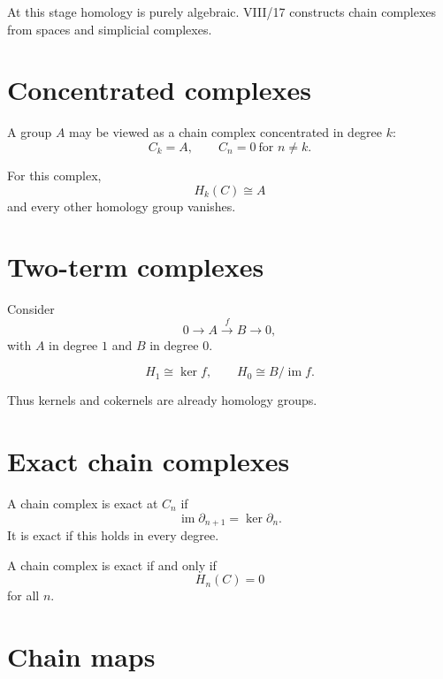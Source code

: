 At this stage homology is purely algebraic.  VIII/17 constructs chain
complexes from spaces and simplicial complexes.

\section{Concentrated complexes}

A group \(A\) may be viewed as a chain complex concentrated in degree \(k\):
\[
C_k=A,\qquad C_n=0\ \text{for }n\ne k.
\]

\begin{example}
For this complex,
\[
H_k(C)\cong A
\]
and every other homology group vanishes.
\end{example}

\section{Two-term complexes}

Consider
\[
0\longrightarrow A\xrightarrow{f}B\longrightarrow0,
\]
with \(A\) in degree \(1\) and \(B\) in degree \(0\).

\begin{proposition}
\label{prop:viii16-two-term}
\[
H_1\cong\ker f,
\qquad
H_0\cong B/\operatorname{im}f.
\]
\end{proposition}

Thus kernels and cokernels are already homology groups.

\section{Exact chain complexes}

\begin{definition}[Exactness]
\label{def:viii16-exact}
A chain complex is exact at \(C_n\) if
\[
\operatorname{im}\partial_{n+1}
=
\ker\partial_n.
\]
It is exact if this holds in every degree.
\end{definition}

\begin{proposition}
\label{prop:viii16-exact-acyclic}
A chain complex is exact if and only if
\[
H_n(C)=0
\]
for all \(n\).
\end{proposition}

\section{Chain maps}

